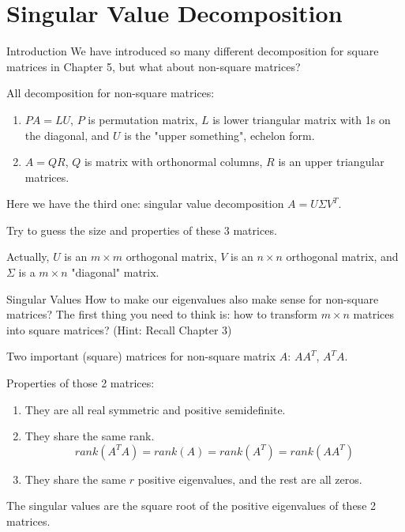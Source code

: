\documentclass{beamer}
\begin{document}
\section{Singular Value Decomposition}
\begin{frame}{Introduction}
We have introduced so many different decomposition for square matrices in Chapter 5, but what about non-square matrices?

All decomposition for non-square matrices:
\begin{enumerate}
    \item $PA=LU$, $P$ is permutation matrix, $L$ is lower triangular matrix with 1s on the diagonal, and $U$ is the "upper something", echelon form.
    \item $A=QR$, $Q$ is matrix with orthonormal columns, $R$ is an upper triangular matrices.
\end{enumerate}

Here we have the third one: singular value decomposition $A=U\varSigma V^T$.

\vspace{3pt}
Try to guess the size and properties of these 3 matrices.

\vspace{3pt}
Actually, $U$ is an $m\times m$ orthogonal matrix, $V$ is an $n\times n$ orthogonal matrix, and $\varSigma$ is a $m\times n$ "diagonal" matrix.
\end{frame}

\begin{frame}{Singular Values}
How to make our eigenvalues also make sense for non-square matrices? The first thing you need to think is: how to transform $m\times n$ matrices into square matrices? (Hint: Recall Chapter 3)

\vspace{3pt}
Two important (square) matrices for non-square matrix $A$: $AA^T$, $A^TA$.

\vspace{3pt}
Properties of those 2 matrices:
\begin{enumerate}
    \item They are all real symmetric and positive semidefinite.
    \item They share the same rank.
    \begin{equation*}
        rank\left( A^TA \right) =rank\left( A \right) =rank\left( A^T \right) =rank\left( AA^T \right)
    \end{equation*}
    \item They share the same $r$ positive eigenvalues, and the rest are all zeros.
\end{enumerate}
The singular values are the square root of the positive eigenvalues of these 2 matrices.
\end{frame}
\end{document}
